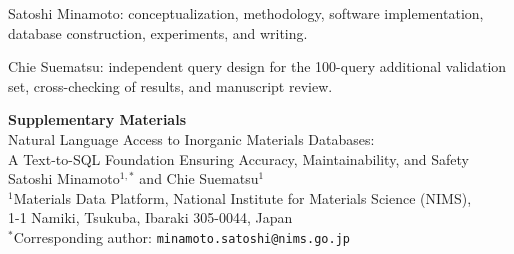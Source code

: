 Satoshi Minamoto: conceptualization, methodology, software implementation, database construction, experiments, and writing.

Chie Suematsu: independent query design for the 100-query additional validation set, cross-checking of results, and manuscript review.






\clearpage
\onecolumn

\appendix
\renewcommand{\thesection}{S\arabic{section}}
\renewcommand{\thetable}{S\arabic{table}}
\renewcommand{\thefigure}{S\arabic{figure}}
\renewcommand{\theequation}{S\arabic{equation}}
\setcounter{section}{0}
\setcounter{table}{0}
\setcounter{figure}{0}
\setcounter{equation}{0}
\makeatletter
\def\@seccntformat#1{\csname the#1\endcsname.\hskip 0.5em}
\makeatother

\begin{center}
  {\LARGE\bfseries Supplementary Materials}\\[0.8em]
  {\large Natural Language Access to Inorganic Materials Databases:\\
  A Text-to-SQL Foundation Ensuring Accuracy, Maintainability, and Safety}\\[1.0em]
  {\normalsize Satoshi Minamoto$^{1,*}$ and Chie Suematsu$^{1}$}\\[0.3em]
  {\small $^{1}$Materials Data Platform, National Institute for Materials Science (NIMS),\\
  1-1 Namiki, Tsukuba, Ibaraki 305-0044, Japan}\\[0.3em]
  {\small $^{*}$Corresponding author: \texttt{minamoto.satoshi@nims.go.jp}}
\end{center}
\vspace{1.0em}
\noindent\hrulefill
\vspace{1.0em}

